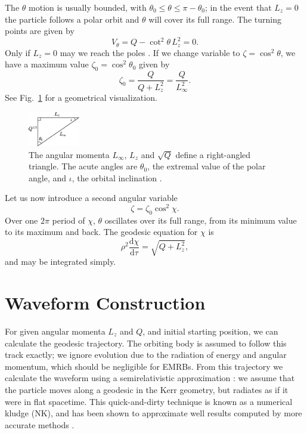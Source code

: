 \documentclass[useAMS,usedcolumn,usegraphicx,usenatbib]{mn2e}
\newcommand{\figref}[1]{Fig.~\ref{fig:#1}}
\newcommand{\dd}{\ensuremath{\mathrm{d}}}
\newcommand{\diff}[2]{\ensuremath{\frac{\dd {#1}}{\dd {#2}}}}
\begin{document}
The $\theta$ motion is usually bounded, with $\theta_0 \leq \theta \leq \pi - \theta_0$; in the event that $L_z = 0$ the particle follows a polar orbit and $\theta$ will cover its full range. The turning points are given by
\begin{equation}
V_\theta = Q - \cot^2\theta\, L_z^2 = 0.
\end{equation}
Only if $L_z = 0$ may we reach the poles \citep{Wilkins1972}. If we change variable to $\zeta = \cos^2\theta$, we have a maximum value $\zeta_0 = \cos^2\theta_0$ given by
\begin{equation}
\zeta_0 = \frac{Q}{Q+L_z^2} = \frac{Q}{L_\infty^2}.
\label{eq:theta_0}
\end{equation}
See \figref{L_triangle} for a geometrical visualization.
\begin{figure}
\begin{center}
\includegraphics[width=0.2\textwidth]{Triangle.eps}
    \caption{The angular momenta $L_\infty$, $L_z$ and $\sqrt{Q}$ define a right-angled triangle. The acute angles are $\theta_0$, the extremal value of the polar angle, and $\iota$, the orbital inclination \citep*{Glampedakis2002}.}
   \label{fig:L_triangle}
\end{center}
\end{figure}
Let us now introduce a second angular variable \citep{Drasco2004}
\begin{equation}
\zeta = \zeta_0\cos^2\chi.
\end{equation}
Over one $2\pi$ period of $\chi$, $\theta$ oscillates over its full range, from its minimum value to its maximum and back. The geodesic equation for $\chi$ is
\begin{equation}
\rho^2\diff{\chi}{\tau} = \sqrt{Q + L_z^2},
\end{equation}
and may be integrated simply.

\section{Waveform Construction}\label{sec:Kludge}

For given angular momenta $L_z$ and $Q$, and initial starting position, we can calculate the geodesic trajectory. The orbiting body is assumed to follow this track exactly; we ignore evolution due to the radiation of energy and angular momentum, which should be negligible for EMRBs. From this trajectory we calculate the waveform using a semirelativistic approximation \citep{Ruffini1981}: we assume that the particle moves along a geodesic in the Kerr geometry, but radiates as if it were in flat spacetime. This quick-and-dirty technique is known as a numerical kludge (NK), and has been shown to approximate well results computed by more accurate methods \citep*{Babak2007}.
\end{document}
